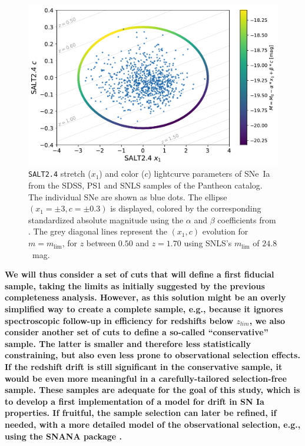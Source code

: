 \documentclass[]{aa}
\begin{document}
\begin{figure}
    \centering
    \includegraphics[width=0.95\linewidth]{Article_figures/zmax_maglim_snls.pdf}
    \caption{\textsc{\texttt{SALT2.4}} stretch ($x_1$) and color ($c$)
        lightcurve parameters of SNe~Ia from the SDSS, PS1 and SNLS samples of
        the Pantheon catalog. The individual SNe are shown as blue dots. The
        ellipse $(x_1=\pm3, c=\pm0.3)$ is displayed, colored by the
        corresponding standardized absolute magnitude using the $\alpha$ and
        $\beta$ coefficients from \cite{scolnic2018a}. The grey diagonal lines
        represent the $(x_1, c)$ evolution for $m = m_{\lim}$, for $z$ between
        $0.50$ and $z=1.70$ using SNLS's $m_{\lim}$ of $24.8$~mag.}
    \label{fig:maglim}
\end{figure}

\textbf{We will thus consider a set of cuts that will define a first fiducial
    sample, taking the limits as initially suggested by the previous
    completeness analysis. However, as this solution might be an overly
    simplified way to create a complete sample, e.g., because it ignores
    spectroscopic follow-up in efficiency for redshifts below $z_{lim}$, we
    also consider another set of cuts to define a so-called ``conservative''
    sample. The latter is smaller and therefore less statistically constraining,
    but also even less prone to observational selection effects. If the redshift
    drift is still significant in the conservative sample, it would be even more
    meaningful in a carefully-tailored selection-free sample. These samples are
    adequate for the goal of this study, which is to develop a first
    implementation of a model for drift in SN Ia properties. If fruitful, the
    sample selection can later be refined, if needed, with a more detailed model
of the observational selection, e.g., using the SNANA package \citep{SNANA}.}
\end{document}
